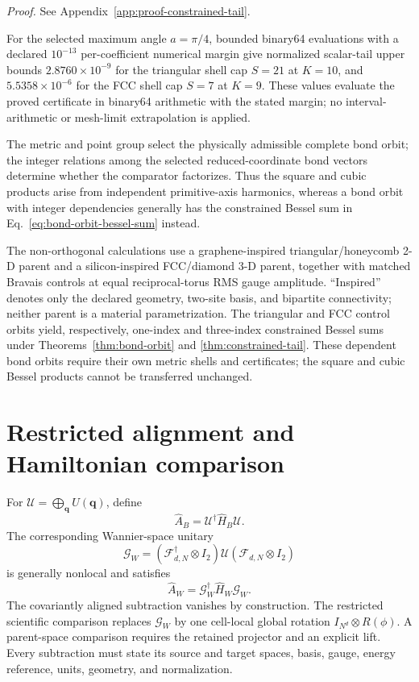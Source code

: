 \documentclass[11pt]{article}
\begin{document}
\noindent\emph{Proof.} See Appendix~\ref{app:proof-constrained-tail}.


For the selected maximum angle $a=\pi/4$, bounded binary64 evaluations with a declared
$10^{-13}$ per-coefficient numerical margin give normalized scalar-tail upper bounds
$2.8760\times10^{-9}$ for the triangular shell cap $S=21$ at $K=10$, and
$5.5358\times10^{-6}$ for the FCC shell cap $S=7$ at $K=9$. These values evaluate the
proved certificate in binary64 arithmetic with the stated margin; no interval-arithmetic
or mesh-limit extrapolation is applied.

The metric and point group select the physically admissible complete bond orbit; the
integer relations among the selected reduced-coordinate bond vectors determine whether
the comparator factorizes. Thus the square and cubic products arise from independent
primitive-axis harmonics, whereas a bond orbit with integer dependencies generally has
the constrained Bessel sum in Eq.~\eqref{eq:bond-orbit-bessel-sum} instead.

The non-orthogonal calculations use a graphene-inspired triangular/honeycomb 2-D
parent and a silicon-inspired FCC/diamond 3-D parent, together with matched Bravais
controls at equal reciprocal-torus RMS gauge amplitude. ``Inspired'' denotes only the
declared geometry, two-site basis, and bipartite connectivity; neither parent is a
material parametrization. The triangular and FCC control orbits yield, respectively,
one-index and three-index constrained Bessel sums under
Theorems~\ref{thm:bond-orbit} and \ref{thm:constrained-tail}. These dependent bond
orbits require their own metric shells and certificates; the square and cubic Bessel
products cannot be transferred unchanged.

\section{Restricted alignment and Hamiltonian comparison}

For $\mathcal U=\bigoplus_{\mathbf q}U(\mathbf q)$, define
\begin{equation}
 \widehat A_B=\mathcal U^\dagger\widehat H_B\mathcal U.
\end{equation}
The corresponding Wannier-space unitary
\begin{equation}
 \mathcal G_W=(\mathcal F_{d,N}^\dagger\otimes I_2)
 \mathcal U(\mathcal F_{d,N}\otimes I_2)
\end{equation}
is generally nonlocal and satisfies
\begin{equation}
 \widehat A_W=\mathcal G_W^\dagger\widehat H_W\mathcal G_W.
 \label{eq:covariant}
\end{equation}
The covariantly aligned subtraction vanishes by construction. The restricted scientific
comparison replaces $\mathcal G_W$ by one cell-local global rotation
$I_{N^d}\otimes R(\phi)$. A parent-space comparison requires the retained projector and
an explicit lift. Every subtraction must state its source and target spaces, basis,
gauge, energy reference, units, geometry, and normalization.
\end{document}
